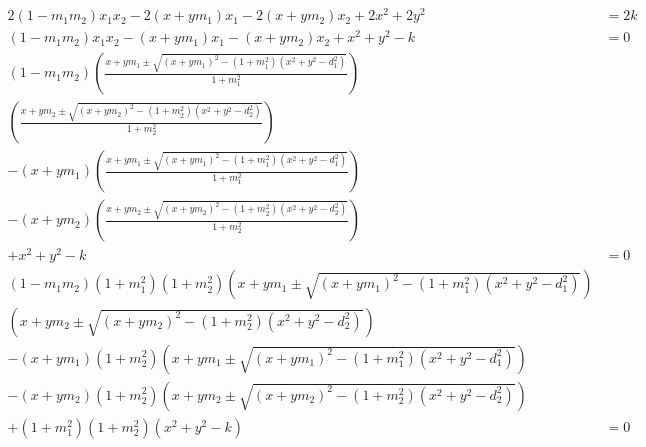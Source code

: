 \documentclass{article}
\begin{document}
\begin{align*}
  2 (1 - m_1 m_2) x_1 x_2 - 2 (x + y m_1) x_1 - 2 (x + y m_2) x_2 + 2 x^2 + 2 y^2 &= 2 k\\
  (1 - m_1 m_2) x_1 x_2 - (x + y m_1) x_1 - (x + y m_2) x_2 + x^2 + y^2 - k &= 0\\
  (1 - m_1 m_2)
  (\frac{x + y m_1 \pm \sqrt{(x + y m_1)^2 - (1 + m_1^2)(x^2 + y^2 - d_1^2)}}{1 + m_1^2})\\
  (\frac{x + y m_2 \pm \sqrt{(x + y m_2)^2 - (1 + m_2^2)(x^2 + y^2 - d_2^2)}}{1 + m_2^2})\\
  - (x + y m_1)
  (\frac{x + y m_1 \pm \sqrt{(x + y m_1)^2 - (1 + m_1^2)(x^2 + y^2 - d_1^2)}}{1 + m_1^2})\\
  - (x + y m_2)
  (\frac{x + y m_2 \pm \sqrt{(x + y m_2)^2 - (1 + m_2^2)(x^2 + y^2 - d_2^2)}}{1 + m_2^2})\\
  + x^2 + y^2 - k &= 0\\
  (1 - m_1 m_2) (1 + m_1^2)(1 + m_2^2)
  (x + y m_1 \pm \sqrt{(x + y m_1)^2 - (1 + m_1^2)(x^2 + y^2 - d_1^2)})\\
  (x + y m_2 \pm \sqrt{(x + y m_2)^2 - (1 + m_2^2)(x^2 + y^2 - d_2^2)})\\
  - (x + y m_1) (1 + m_2^2)
  (x + y m_1 \pm \sqrt{(x + y m_1)^2 - (1 + m_1^2)(x^2 + y^2 - d_1^2)})\\
  - (x + y m_2) (1 + m_2^2)
  (x + y m_2 \pm \sqrt{(x + y m_2)^2 - (1 + m_2^2)(x^2 + y^2 - d_2^2)})\\
  + (1 + m_1^2)(1 + m_2^2)(x^2 + y^2 - k) &= 0\\
\end{align*}
\end{document}
